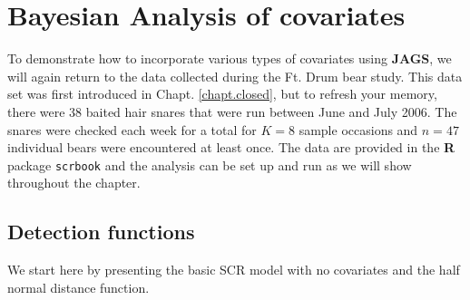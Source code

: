 \section{Bayesian Analysis of covariates}

To demonstrate how to incorporate various types of covariates using
{\bf JAGS}, we will again return to the data collected during the
Ft. Drum bear study.  This data set was first introduced in Chapt. \ref{chapt.closed},
but to refresh your memory, there were 38 baited hair snares that were run
between June and July 2006.  The snares were checked each week for a
total for $K=8$ sample occasions and $n=47$ individual bears were
encountered at least once.  The data are provided in the {\bf R}
package \mbox{\tt scrbook} and the analysis can be set up and run as
we will show throughout the chapter.

\subsection{Detection functions}

We start here by presenting the basic SCR model with no covariates and
the half normal distance function.

